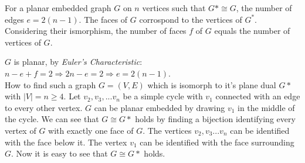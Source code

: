 \documentclass[a4paper]{article}
\begin{document}
	\newpage
	\begin{solution}{20}
		\begin{theorem}{For a planar embedded graph $G$ on $n$ vertices such that $G* \cong G$, the number of edges $e = 2(n - 1)$.}
			The faces of $G$ corrospond to the vertices of $G^*$. Considering their ismorphism, the number of faces $f$ of $G$ equals the number of vertices of $G$.
			
			$G$ is planar, by \emph{Euler's Characteristic}: $n - e + f = 2 \Rightarrow 2n - e = 2 \Rightarrow e = 2(n-1)$. \\
			How to find such a graph $G=(V,E)$ which is isomorph to it's plane dual $G*$ with $|V| = n \geq 4$. 
			Let $v_2,v_3,...v_n$ be a simple cycle with $v_1$ connected with an edge to every other vertex. 
			$G$ can be planar embedded by drawing $v_1$ in the middle of the cycle. 
			We can see that $G \cong G*$ holds by finding a bijection identifying every vertex of $G$ with exactly one face of $G$. 
			The vertices $v_2,v_3...v_n$ can be identified with the face below it. 
			The vertex $v_1$ can be identified with the face surrounding $G$. 
			Now it is easy to see that $G \cong G*$ holds. 
			\begin{center}
			\end{center}
			
		\end{theorem}
	\end{solution}
	
\end{document}
